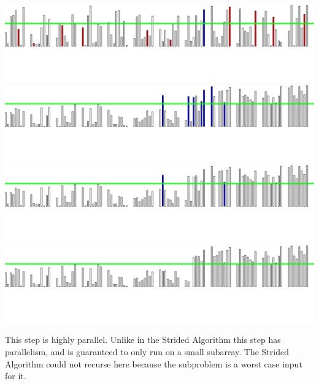 \documentclass[xcolor=x11names, svgnames, rgb]{beamer}
\begin{document}
\begin{frame}[t]{}
\begin{overprint}
	\includegraphics[width=\linewidth]{imgs/smoothedAlgSim/smoothedAlgSim_35.png}
	\onslide<5>\includegraphics[width=\linewidth]{imgs/smoothedAlgSim/smoothedAlgSim_4.png}
	\onslide<6>\includegraphics[width=\linewidth]{imgs/smoothedAlgSim/smoothedAlgSim_45.png}
	\onslide<7>\includegraphics[width=\linewidth]{imgs/smoothedAlgSim/smoothedAlgSim_5.png}
	\end{overprint}
	\vspace{0.25cm}
	\begin{overprint}
	This step is highly parallel.
	\onslide<7>Unlike in the Strided Algorithm this step has parallelism, and is guaranteed to only run on a small subarray. The Strided Algorithm could not recurse here because the subproblem is a worst case input for it.
	\end{overprint}
\end{frame}
\end{document}
